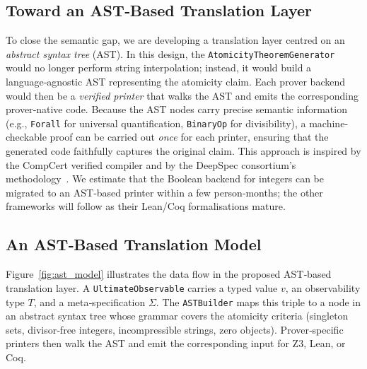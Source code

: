 \subsection{Toward an AST‑Based Translation Layer}

To close the semantic gap, we are developing a translation layer
centred on an \emph{abstract syntax tree} (AST).  In this design,
the \texttt{AtomicityTheoremGenerator} would no longer perform string
interpolation; instead, it would build a language‑agnostic AST
representing the atomicity claim.  Each prover backend would then
be a \emph{verified printer} that walks the AST and emits the
corresponding prover‑native code.  Because the AST nodes carry
precise semantic information (e.g., \texttt{Forall} for universal
quantification, \texttt{BinaryOp} for divisibility), a machine‑
checkable proof can be carried out \emph{once} for each printer,
ensuring that the generated code faithfully captures the original
claim.  This approach is inspired by the CompCert verified compiler
and by the DeepSpec consortium's methodology~\cite{deepspec2016,leroy2009coq}.
We estimate that the Boolean backend for integers can be migrated
to an AST‑based printer within a few person‑months; the other
frameworks will follow as their Lean/Coq formalisations mature.

\subsection{An AST‑Based Translation Model}

Figure~\ref{fig:ast_model} illustrates the data flow in the proposed
AST‑based translation layer.  A \texttt{UltimateObservable} carries
a typed value $v$, an observability type $T$, and a meta‑specification
$\Sigma$.  The \texttt{ASTBuilder} maps this triple to a node in an
abstract syntax tree whose grammar covers the atomicity criteria
(singleton sets, divisor‑free integers, incompressible strings, zero
objects).  Prover‑specific printers then walk the AST and emit the
corresponding input for Z3, Lean, or Coq.

